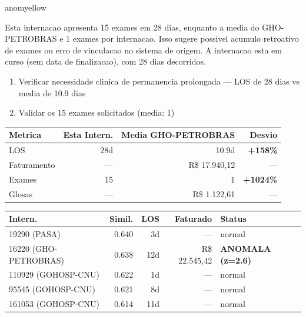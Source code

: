 \documentclass[a4paper,10pt]{article}
\begin{document}
\begin{anomalycard}[Internacao 166300 | GHO-PETROBRAS | MODERADO (z=2.48)]{anomyellow}
\vspace{2pt}\begin{tcolorbox}[colback=severityred!20,colframe=anomyellow,title={\textbf{Interpretacao de Negocio}},fonttitle=\bfseries\small,left=4pt,right=4pt,top=3pt,bottom=3pt]
{\small Esta internacao apresenta 15 exames em 28 dias, enquanto a media do GHO-PETROBRAS e 1 exames por internacao. Isso sugere possivel acumulo retroativo de exames ou erro de vinculacao no sistema de origem. A internacao esta em curso (sem data de finalizacao), com 28 dias decorridos.}
\end{tcolorbox}
\begin{tcolorbox}[colback=severityyellow!30,colframe=anomorange,title={\textbf{Recomendacoes Especificas}},fonttitle=\bfseries\small,left=4pt,right=4pt,top=3pt,bottom=3pt]
\begin{enumerate}[nosep,leftmargin=16pt]
\item {\small Verificar necessidade clinica de permanencia prolongada --- LOS de 28 dias vs media de 10.9 dias}
\item {\small Validar os 15 exames solicitados (media: 1)}
\end{enumerate}
\end{tcolorbox}
\begin{center}\begin{tabular}{l r r r}\toprule\textbf{Metrica} & \textbf{Esta Intern.} & \textbf{Media GHO-PETROBRAS} & \textbf{Desvio} \\\midrule
LOS & 28d & 10.9d & \textcolor{anomred}{\textbf{+158\%}} \\
Faturamento & --- & R\$ 17.940,12 & --- \\
Exames & 15 & 1 & \textcolor{anomred}{\textbf{+1024\%}} \\
Glosas & --- & R\$ 1.122,61 & --- \\
\bottomrule\end{tabular}\end{center}

\begin{tabular}{l r r r l}\toprule\textbf{Intern.} & \textbf{Simil.} & \textbf{LOS} & \textbf{Faturado} & \textbf{Status} \\\midrule
19290 (PASA) & 0.640 & 3d & --- & \textcolor{jcubeblue}{normal} \\
16220 (GHO-PETROBRAS) & 0.638 & 12d & R\$ 22.545,42 & \textcolor{anomred}{\textbf{ANOMALA (z=2.6)}} \\
110929 (GOHOSP-CNU) & 0.622 & 1d & --- & \textcolor{jcubeblue}{normal} \\
95545 (GOHOSP-CNU) & 0.621 & 8d & --- & \textcolor{jcubeblue}{normal} \\
161053 (GOHOSP-CNU) & 0.614 & 11d & --- & \textcolor{jcubeblue}{normal} \\
\bottomrule\end{tabular}


\end{anomalycard}
\end{document}
